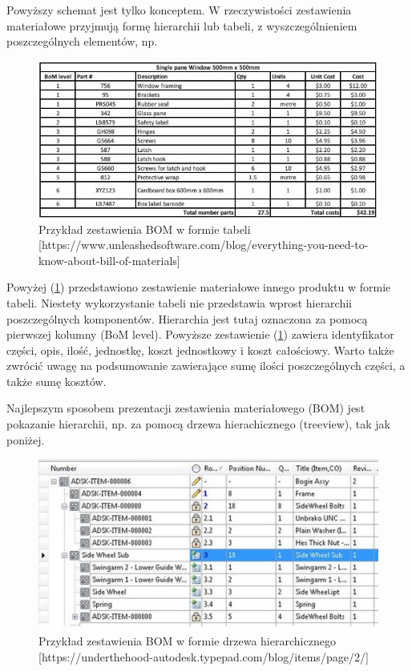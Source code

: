 \documentclass[12pt,twoside]{article}
\begin{document}
Powyższy schemat jest tylko konceptem. W rzeczywistości zestawienia materiałowe przyjmują formę hierarchii lub tabeli, z wyszczególnieniem poszczególnych elementów, np.

\begin{figure}[ht]
	\centering
	\includegraphics[width=\textwidth]{figures/examples/table.jpg}
	\caption{Przykład zestawienia BOM w formie tabeli [https://www.unleashedsoftware.com/blog/everything-you-need-to-know-about-bill-of-materials]}
\label{fig:example:table}
\end{figure}

Powyżej (\ref{fig:example:table}) przedstawiono zestawienie materiałowe innego produktu w formie tabeli. Niestety wykorzystanie tabeli nie przedstawia wprost hierarchii poszczególnych komponentów. Hierarchia jest tutaj oznaczona za pomocą pierwszej kolumny (BoM level). Powyższe zestawienie (\ref{fig:example:table}) zawiera identyfikator części, opis, ilość, jednostkę, koszt jednostkowy i koszt całościowy. Warto także zwrócić uwagę na podsumowanie zawierające sumę ilości poszczególnych części, a także sumę kosztów.

Najlepszym sposobem prezentacji zestawienia materiałowego (BOM) jest pokazanie hierarchii, np. za pomocą drzewa hierachicznego (treeview), tak jak poniżej.

\begin{figure}[ht]
	\centering
	\includegraphics[width=\textwidth]{figures/examples/hierarchy.jpg}
	\caption{Przykład zestawienia BOM w formie drzewa hierarchicznego [https://underthehood-autodesk.typepad.com/blog/items/page/2/]}
\label{fig:example:hierarchy}
\end{figure}
\end{document}
